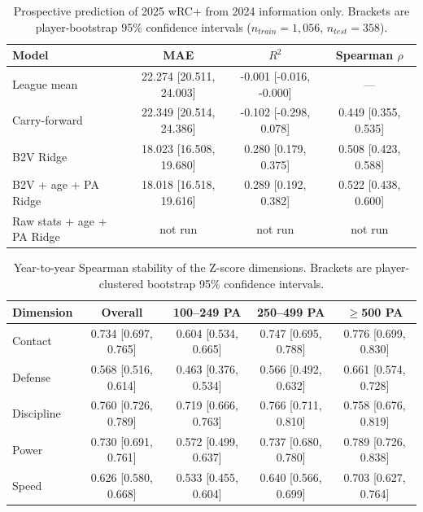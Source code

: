 \begin{table}[t]
\centering
\caption{Prospective prediction of 2025 wRC+ from 2024 information only. Brackets are player-bootstrap 95\% confidence intervals ($n_{train}=1{,}056$, $n_{test}=358$).}
\label{tab:prospective}
\scriptsize
\begin{tabular}{lccc}
\toprule
Model & MAE & $R^2$ & Spearman $\rho$ \\
\midrule
League mean & 22.274 [20.511, 24.003] & -0.001 [-0.016, -0.000] & — \\
Carry-forward & 22.349 [20.514, 24.386] & -0.102 [-0.298, 0.078] & 0.449 [0.355, 0.535] \\
B2V Ridge & 18.023 [16.508, 19.680] & 0.280 [0.179, 0.375] & 0.508 [0.423, 0.588] \\
B2V + age + PA Ridge & 18.018 [16.518, 19.616] & 0.289 [0.192, 0.382] & 0.522 [0.438, 0.600] \\
Raw stats + age + PA Ridge & not run & not run & not run \\
\bottomrule
\end{tabular}
\end{table}

\begin{table}[t]
\centering
\caption{Year-to-year Spearman stability of the Z-score dimensions. Brackets are player-clustered bootstrap 95\% confidence intervals.}
\label{tab:stability}
\scriptsize
\begin{tabular}{lcccc}
\toprule
Dimension & Overall & 100--249 PA & 250--499 PA & $\geq$500 PA \\
\midrule
Contact & 0.734 [0.697, 0.765] & 0.604 [0.534, 0.665] & 0.747 [0.695, 0.788] & 0.776 [0.699, 0.830] \\
Defense & 0.568 [0.516, 0.614] & 0.463 [0.376, 0.534] & 0.566 [0.492, 0.632] & 0.661 [0.574, 0.728] \\
Discipline & 0.760 [0.726, 0.789] & 0.719 [0.666, 0.763] & 0.766 [0.711, 0.810] & 0.758 [0.676, 0.819] \\
Power & 0.730 [0.691, 0.761] & 0.572 [0.499, 0.637] & 0.737 [0.680, 0.780] & 0.789 [0.726, 0.838] \\
Speed & 0.626 [0.580, 0.668] & 0.533 [0.455, 0.604] & 0.640 [0.566, 0.699] & 0.703 [0.627, 0.764] \\
\bottomrule
\end{tabular}
\end{table}